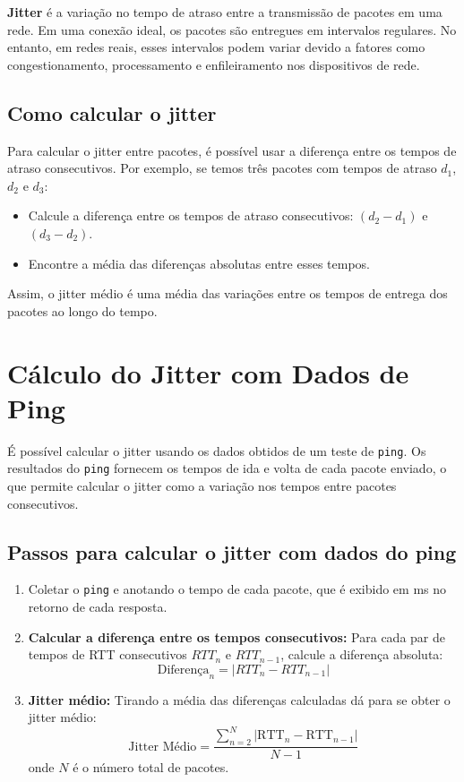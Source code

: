 \documentclass[a4paper,12pt]{article}
\begin{document}
\textbf{Jitter} é a variação no tempo de atraso entre a transmissão de pacotes em uma rede. Em uma conexão ideal, os pacotes são entregues em intervalos regulares. No entanto, em redes reais, esses intervalos podem variar devido a fatores como congestionamento, processamento e enfileiramento nos dispositivos de rede. 
\subsection*{Como calcular o jitter}
Para calcular o jitter entre pacotes, é possível usar a diferença entre os tempos de atraso consecutivos. Por exemplo, se temos três pacotes com tempos de atraso \(d_1\), \(d_2\) e \(d_3\):

\begin{itemize}
    \item Calcule a diferença entre os tempos de atraso consecutivos: \((d_2 - d_1)\) e \((d_3 - d_2)\).
    \item Encontre a média das diferenças absolutas entre esses tempos.
\end{itemize}

Assim, o jitter médio é uma média das variações entre os tempos de entrega dos pacotes ao longo do tempo.

\section*{Cálculo do Jitter com Dados de Ping}

É possível calcular o jitter usando os dados obtidos de um teste de \texttt{ping}. Os resultados do \texttt{ping} fornecem os tempos de ida e volta de cada pacote enviado, o que permite calcular o jitter como a variação nos tempos entre pacotes consecutivos.

\subsection*{Passos para calcular o jitter com dados do ping}
\begin{enumerate}
    \item Coletar o \texttt{ping} e anotando o tempo de cada pacote, que é exibido em ms no retorno de cada resposta.
    
    \item \textbf{Calcular a diferença entre os tempos consecutivos:} Para cada par de tempos de RTT consecutivos \( RTT_n \) e \( RTT_{n-1} \), calcule a diferença absoluta:
    \[
    \text{Diferença}_n = | RTT_n - RTT_{n-1} |
    \]

    \item \textbf{Jitter médio:} Tirando a média das diferenças calculadas dá para se obter o jitter médio:
    \[
    \text{Jitter Médio} = \frac{\sum_{n=2}^{N} |\text{RTT}_n - \text{RTT}_{n-1}|}{N - 1}
    \]
    onde \( N \) é o número total de pacotes.
\end{enumerate}
\end{document}

